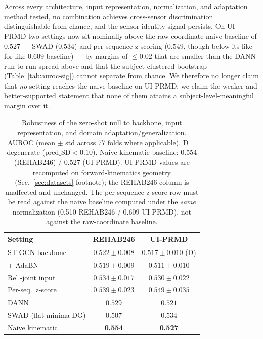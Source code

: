 \documentclass[10pt,journal]{IEEEtran}
\begin{document}
Across every architecture, input representation, normalization, and adaptation method tested, no combination achieves cross-sensor discrimination distinguishable from chance, and the sensor identity signal persists. On UI-PRMD two settings now sit nominally above the raw-coordinate naive baseline of $0.527$ --- SWAD ($0.534$) and per-sequence z-scoring ($0.549$, though below its like-for-like $0.609$ baseline) --- by margins of $\le 0.02$ that are smaller than the DANN run-to-run spread above and that the subject-clustered bootstrap (Table~\ref{tab:auroc-sig}) cannot separate from chance. We therefore no longer claim that \emph{no} setting reaches the naive baseline on UI-PRMD; we claim the weaker and better-supported statement that none of them attains a subject-level-meaningful margin over it.

\begin{table}[t]
\centering
\small
\setlength{\tabcolsep}{3pt}
\caption{Robustness of the zero-shot null to backbone, input representation, and domain adaptation/generalization. AUROC (mean $\pm$ std across 77 folds where applicable). D = degenerate ($\text{pred\_SD}<0.10$). Naive kinematic baseline: 0.554 (REHAB246) / 0.527 (UI-PRMD). UI-PRMD values are recomputed on forward-kinematics geometry (Sec.~\ref{sec:datasets} footnote); the REHAB246 column is unaffected and unchanged. The per-sequence z-score row must be read against the naive baseline computed under the \emph{same} normalization (0.510 REHAB246 / 0.609 UI-PRMD), not against the raw-coordinate baseline.}
\label{tab:robustness-c}
\begin{tabular}{@{}lcc@{}}
\toprule
Setting & REHAB246 & UI-PRMD \\
\midrule
ST-GCN backbone         & $0.522{\pm}0.008$ & $0.517{\pm}0.010$ (D) \\
\quad + AdaBN           & $0.519{\pm}0.009$ & $0.511{\pm}0.010$ \\
Rel.-joint input        & $0.534{\pm}0.017$ & $0.530{\pm}0.022$ \\
Per-seq.\ z-score       & $0.539{\pm}0.023$ & $0.549{\pm}0.035$ \\
DANN                    & $0.529$           & $0.521$ \\
SWAD (flat-minima DG)   & $0.507$           & $0.534$ \\
\midrule
Naive kinematic         & \textbf{0.554}    & \textbf{0.527} \\
\bottomrule
\end{tabular}
\end{table}
\end{document}
